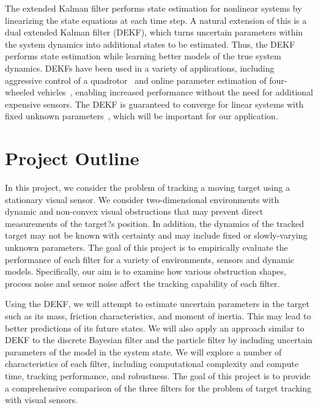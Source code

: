 \documentclass[11pt, oneside]{article}   	%
\begin{document}
The extended Kalman filter performs state estimation for nonlinear systems by linearizing the state equations at each time step. A natural extension of this is a dual extended Kalman filter (DEKF), which turns uncertain parameters within the system dynamics into additional states to be estimated. Thus, the DEKF performs state estimation while learning better models of the true system dynamics. DEKFs have been used in a variety of applications, including aggressive control of a quadrotor~\cite{bouffard2012learning} and online parameter estimation of four-wheeled vehicles~\cite{wenzel2006dual}, enabling increased performance without the need for additional expensive sensors. The DEKF is guaranteed to converge for linear systems with fixed unknown parameters~\cite{ljung1979asymptotic}, which will be important for our application. 

\section{Project Outline}

In this project, we consider the problem of tracking a moving target using a stationary visual sensor. We consider two-dimensional environments with dynamic and non-convex visual obstructions that may prevent direct measurements of the target?s position. In addition, the dynamics of the tracked target may not be known with certainty and may include fixed or slowly-varying unknown parameters. The goal of this project is to empirically evaluate the performance of each filter for a variety of environments, sensors and dynamic models. Specifically, our aim is to examine how various obstruction shapes, process noise and sensor noise affect the tracking capability of each filter. 

Using the DEKF, we will attempt to estimate uncertain parameters in the target such as its mass, friction characteristics, and moment of inertia. This may lead to better predictions of its future states. We will also apply an approach similar to DEKF to the discrete Bayesian filter and the particle filter by including uncertain parameters of the model in the system state. We will explore a number of characteristics of each filter, including computational complexity and compute time, tracking performance, and robustness. The goal of this project is to provide a comprehensive comparison of the three filters for the problem of target tracking with visual sensors.  




{}
\end{document}
